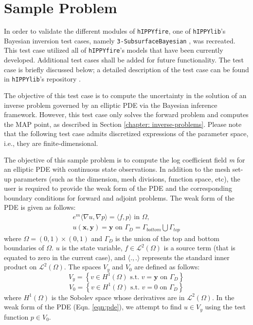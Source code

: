 \chapter{Sample Problem}
\label{chapter:sample-problem}

In order to validate the different modules of \texttt{hIPPYfire}, one of \texttt{hIPPYlib}'s Bayesian inversion test cases, namely \texttt{3-SubsurfaceBayesian} \cite{Villa_hIPPYlib_An_Extensible_2020}, was recreated. This test case utilized all of \texttt{hIPPYfire}'s models that have been currently developed. Additional test cases shall be added for future functionality. The test case is briefly discussed below; a detailed description of the test case can be found in \texttt{hIPPYlib}'s repository \cite{Villa_hIPPYlib_An_Extensible_2020}.

The objective of this test case is to compute the uncertainty in the solution of an inverse problem governed by an elliptic PDE via the Bayesian inference framework. However, this test case only solves the forward problem and computes the MAP point, as described in Section \ref{chapter: inverse-problems}. Please note that the following test case admits discretized expressions of the parameter space, i.e., they are finite-dimensional.

The objective of this sample problem is to compute the log coefficient field \textit{m} for an elliptic PDE with continuous state observations. In addition to the mesh set-up parameters (such as the dimension, mesh divisions, function space, etc), the user is required to provide the weak form of the PDE and the corresponding boundary conditions for forward and adjoint problems. The weak form of the PDE is given as follows:
\begin{equation}
    \label{eqn:pde}
    \begin{split}
    e^{m}\langle{\nabla{u}, \nabla{p}}\rangle = \langle{f, p}\rangle \textrm{ in } \Omega, \\
    u(\textbf{x}, \textbf{y}) = \textbf{y} \textrm{ on } \Gamma_D = \Gamma_{bottom} \bigcup \Gamma_{top}
    \end{split}
\end{equation}
where $\Omega = (0, 1) \times (0, 1)$ and $\Gamma_D$ is the union of the top and bottom boundaries of $\Omega$. $u$ is the state variable, $f \in \mathcal{L}^2(\Omega)$ is a source term (that is equated to zero in the current case), and $\langle{.,.}\rangle$ represents the standard inner product on $\mathcal{L}^2(\Omega)$. The spaces $V_{y}$ and $V_0$ are defined as follows:
$$
    V_y = \left\{ v \in H^1(\Omega) \textrm{ s.t. } v = \textbf{y} \textrm{ on } \Gamma_D \right\}
$$
$$
    V_0 = \left\{ v \in H^1(\Omega) \textrm{ s.t. } v = 0 \textrm{ on } \Gamma_D \right\}
$$
where $H^1(\Omega)$ is the Sobolev space whose derivatives are in $\mathcal{L}^2(\Omega)$. In the weak form of the PDE (Eqn. \ref{eqn:pde}), we attempt to find $u \in V_y$ using the test function $p \in V_0$.

